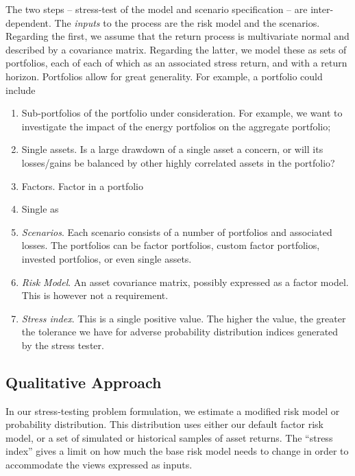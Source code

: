 \documentclass[letter, 12pt]{article}
\begin{document}
The two steps -- stress-test of the model and scenario specification -- are inter-dependent. The \emph{inputs} to the process are the risk model and the scenarios. Regarding the first, we assume that the return process is multivariate normal and described by a covariance matrix. Regarding the latter, we model these as sets of portfolios, each of each of which as an associated stress return, and with a return horizon. Portfolios allow for great generality. For example, a portfolio could include
\begin{enumerate}

\item  Sub-portfolios of the portfolio under consideration. For example, we want to investigate the impact of the energy portfolios on the aggregate portfolio;
\item Single assets. Is a large drawdown of a single asset a concern, or will its losses/gains be balanced by other highly correlated assets in the portfolio?
\item Factors. Factor in a portfolio
\item Single as
\item \emph{Scenarios}. Each scenario consists of a number of portfolios and associated losses. The portfolios can be factor portfolios, custom factor portfolios, invested portfolios, or even single assets.

\item \emph{Risk Model}. An asset covariance matrix, possibly expressed as a factor model. This is however not a requirement.

\item \emph{Stress index}. This is a single positive value. The higher the value, the greater the tolerance we have for adverse probability distribution indices generated by the stress tester.

\end{enumerate}

\subsection{Qualitative Approach}

In our stress-testing problem formulation, we estimate a modified risk model or probability distribution. This distribution uses either our default factor risk model, or a set of simulated or historical samples of asset returns. The ``stress index'' gives a limit on how much the base risk model needs to change in order to accommodate the views expressed as inputs.
\end{document}
